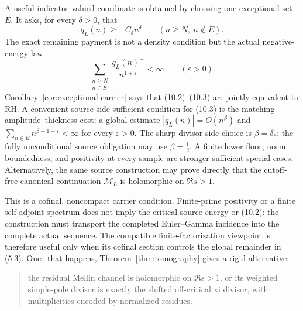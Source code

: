 \documentclass[11pt]{article}
\newcommand{\cM}{\mathcal M}
\begin{document}
A useful indicator-valued coordinate is obtained by choosing one exceptional set $E$.  It asks,
for every $\delta>0$, that
\[
  q_L(n)\ge-C_\delta n^\delta
  \qquad(n\ge N,\ n\notin E).
  \tag{10.2}
\]
The exact remaining payment is not a density condition but the actual negative-energy law
\[
 \sum_{\substack{n\ge N\\n\in E}}
 \frac{q_L(n)^-}{n^{1+\varepsilon}}<\infty
 \qquad(\varepsilon>0).
 \tag{10.3}
\]
Corollary~\ref{cor:exceptional-carrier} says that (10.2)--(10.3) are jointly equivalent to RH.  A convenient
source-side sufficient condition for (10.3) is the matching amplitude--thickness cost: a global
estimate $|q_L(n)|=O(n^\beta)$ and
$\sum_{n\in E}n^{\beta-1-\varepsilon}<\infty$ for every $\varepsilon>0$.  The sharp divisor-side
choice is $\beta=\delta_*$; the fully unconditional source obligation may use
$\beta=\frac12$.  A finite lower floor, norm boundedness, and positivity at every sample are
stronger sufficient special cases.  Alternatively, the same source construction may prove
directly that the cutoff-free canonical continuation $\cM_L$ is holomorphic on $\Re s>1$.

This is a cofinal, noncompact carrier condition.  Finite-prime positivity or a finite
self-adjoint spectrum does not imply the critical source energy or (10.2): the construction must transport the completed
Euler--Gamma incidence into the complete actual sequence.  The compatible finite-factorization
viewpoint is therefore useful only when its cofinal section controls the global remainder in
(5.3).  Once that happens, Theorem~\ref{thm:tomography} gives a rigid alternative:

\begin{quote}
the residual Mellin channel is holomorphic on $\Re s>1$, or its weighted simple-pole divisor is
exactly the shifted off-critical xi divisor, with multiplicities encoded by normalized residues.
\end{quote}
\end{document}
